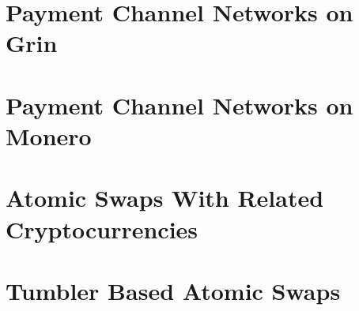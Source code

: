\section{Payment Channel Networks on Grin}\label{sec:paymentChannelsGrin}
\section{Payment Channel Networks on Monero}\label{sec:paymentChannelsMonero}
\section{Atomic Swaps With Related Cryptocurrencies}\label{sec:atomicSwapsAlts}
\section{Tumbler Based Atomic Swaps}\label{sec:tumbler}